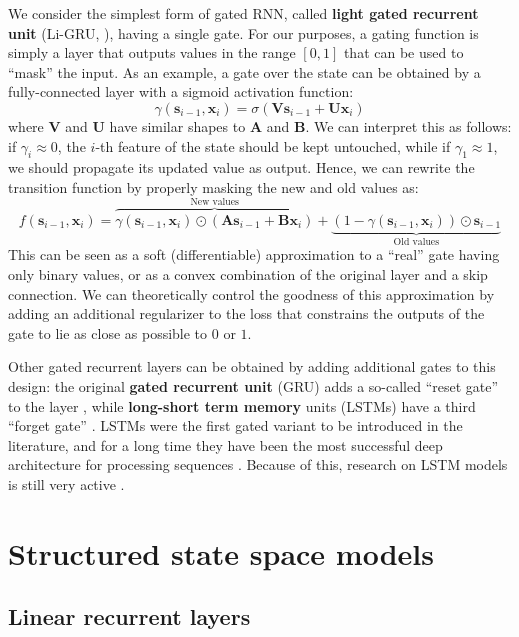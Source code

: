 We consider the simplest form of gated RNN, called \textbf{light gated recurrent unit} (Li-GRU, \cite{ravanelli2018light}), having a single gate. For our purposes, a gating function is simply a layer that outputs values in the range $[0,1]$ that can be used to “mask” the input. As an example, a gate over the state can be obtained by a fully-connected layer with a sigmoid activation function:
%
$$
\gamma(\mathbf{s}_{i-1}, \mathbf{x}_i)=\sigma\left(\mathbf{V}\mathbf{s}_{i-1}+\mathbf{U}\mathbf{x}_i\right)
$$
%
where $\mathbf{V}$ and $\mathbf{U}$ have similar shapes to $\mathbf{A}$ and $\mathbf{B}$. We can interpret this as follows: if $\gamma_i \approx 0$, the $i$-th feature of the state should be kept untouched, while if $\gamma_1 \approx 1$, we should propagate its updated value as output. Hence, we can rewrite the transition function by properly masking the new and old values as:
%
$$
f(\mathbf{s}_{i-1}, \mathbf{x}_i) = \overbrace{\gamma(\mathbf{s}_{i-1}, \mathbf{x}_i)\odot\left(\mathbf{A}\mathbf{s}_{i-1}+\mathbf{B}\mathbf{x}_i\right)}^{\text{New values}} + \underbrace{(1-\gamma(\mathbf{s}_{i-1}, \mathbf{x}_i))\odot\mathbf{s}_{i-1}}_{\text{Old values}}
$$
%
This can be seen as a soft (differentiable) approximation to a “real” gate having only binary values, or as a convex combination of the original layer and a skip connection. We can theoretically control the goodness of this approximation by adding an additional regularizer to the loss that constrains the outputs of the gate to lie as close as possible to $0$ or $1$. 

Other gated recurrent layers can be obtained by adding additional gates to this design: the original  \textbf{gated recurrent unit} (GRU) adds a so-called “reset gate” to the layer \cite{cho2014learning}, while \textbf{long-short term memory} units (LSTMs) have a third “forget gate” \cite{hochreiter1997long}. LSTMs were the first gated variant to be introduced in the literature, and for a long time they have been the most successful deep architecture for processing sequences \cite{schmidhuber2015deep}. Because of this, research on LSTM models is still very active \cite{beck2024xlstm}.

\section{Structured state space models}
\subsection{Linear recurrent layers}

